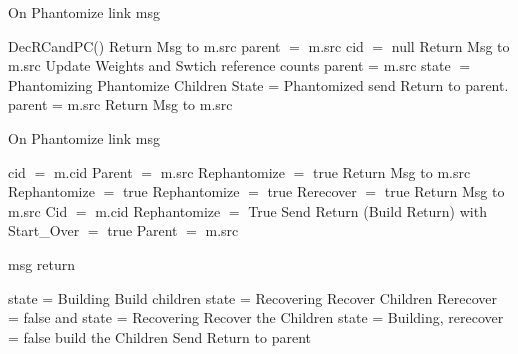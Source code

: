 \documentclass{article}
\begin{document}
\begin{algorithm}
\caption{On Phantomize link msg}
\label{Phantom message received}
\begin{algorithmic}[1]
\State DecRCandPC()
			\State Return Msg to m.src
		\Else
			\State parent $=$ m.src
			\State cid $=$ null
		\EndIf
	\Else
			\State Return Msg to m.src
			\State Update Weights and Swtich reference counts
			\State parent = m.src
			\State state $=$ Phantomizing
			\State Phantomize Children
				\State State = Phantomized
				\State send Return to parent.
			\EndIf
		\Else
			\State parent = m.src
			\State Return Msg to m.src
			\EndIf
	\EndIf
{}
\end{algorithmic}
\end{algorithm}	

\begin{algorithm}
\caption{On Phantomize link msg}
\label{Phantom message received}
\begin{algorithmic}[1]
			\State cid $=$ m.cid
			\State Parent $=$ m.src
			\State Rephantomize $=$ true
		\Else 
			\State Return Msg  to m.src
				\State Rephantomize $=$ true	
			\EndIf
		\EndIf
	\Else 
				\State Rephantomize $=$ true
				\State Rerecover $=$ true
			\EndIf
			\State Return Msg to m.src
		\Else
			\State Cid $=$ m.cid
			\State Rephantomize $=$ True
			\State Send Return (Build Return) with Start\_Over $ =$ true
			\State Parent $=$ m.src
		\EndIf
	\EndIf
\EndIf
\EndProcedure
\end{algorithmic}
\end{algorithm}	
	
	
\begin{algorithm}
\caption{msg return}
\label{ Done message received}
\begin{algorithmic}[1]
				\State state = Building			
				\State Build children
			\Else
				\State state = Recovering
				\State Recover Children
			\EndIf
		\Else
				\State Rerecover = false and state = Recovering
				\State Recover the Children
				\State state = Building, rerecover = false
				\State build the Children
			\Else
				\State Send Return to parent	
			\EndIf
		\EndIf
	\EndIf
\EndIf
{}
\end{algorithmic}
\end{algorithm}
\end{document}
